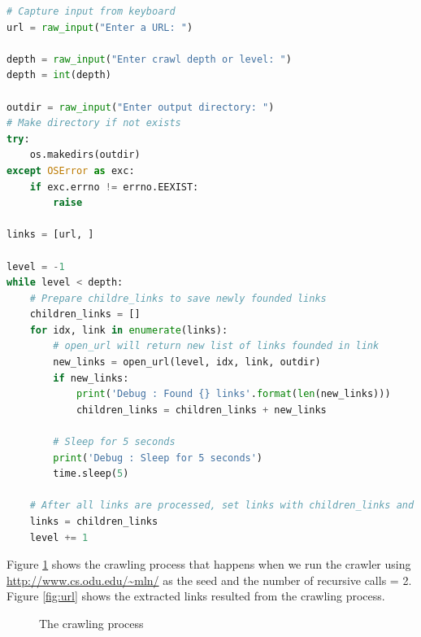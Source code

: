 \documentclass[letterpaper,11pt]{article}
\begin{document}
\begin{lstlisting}[language=python, caption={Simple single-threaded web crawler}, label={lst:web-crawler}]
# Capture input from keyboard
url = raw_input("Enter a URL: ")

depth = raw_input("Enter crawl depth or level: ")
depth = int(depth)

outdir = raw_input("Enter output directory: ")
# Make directory if not exists
try:
    os.makedirs(outdir)
except OSError as exc:
    if exc.errno != errno.EEXIST:
        raise

links = [url, ]

level = -1
while level < depth:
    # Prepare childre_links to save newly founded links
    children_links = []
    for idx, link in enumerate(links):
        # open_url will return new list of links founded in link
        new_links = open_url(level, idx, link, outdir)
        if new_links:
            print('Debug : Found {} links'.format(len(new_links)))
            children_links = children_links + new_links

        # Sleep for 5 seconds
        print('Debug : Sleep for 5 seconds')
        time.sleep(5)

    # After all links are processed, set links with children_links and increase level
    links = children_links
    level += 1


\end{lstlisting}

Figure \ref{fig:crawler} shows the crawling process that happens when we run the crawler using  \url{http://www.cs.odu.edu/~mln/} as the seed and the number of recursive calls = 2. Figure \ref{fig:url} shows the extracted links resulted from the crawling process. 


\begin{figure}[H]


\centering

\caption{The crawling process}

\label{fig:crawler}

\end{figure} 
\end{document}
